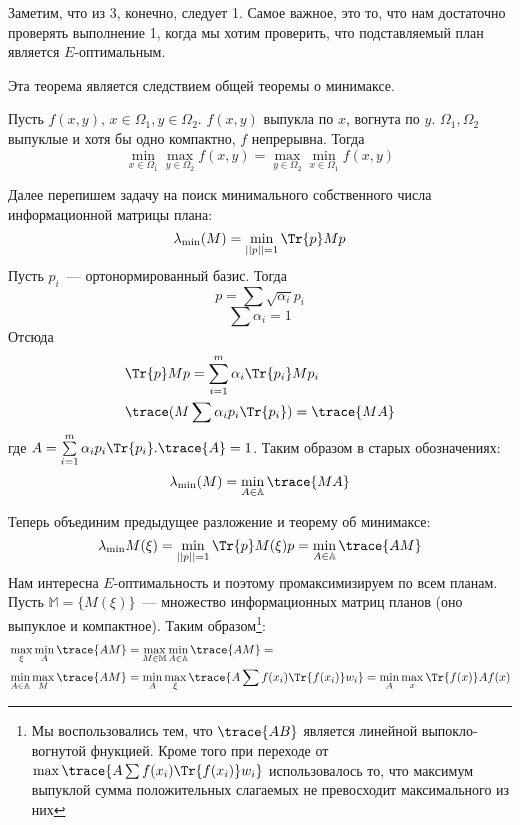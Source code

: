 Заметим, что из 3, конечно, следует 1. Самое важное, это то, что нам достаточно проверять выполнение 1, когда мы хотим проверить, что подставляемый план является $E$-оптимальным.

Эта теорема является следствием общей теоремы о минимаксе.
\begin{thm}
Пусть $f(x,y)$, $x\in \Omega_1, y\in \Omega_2$. $f(x,y)$ выпукла по $x$, вогнута по $y$. $\Omega_1, \Omega_2$ выпуклые и хотя бы одно компактно, $f$ непрерывна. Тогда 
$$ \min\limits_{x \in \Omega_1} \max\limits_{y \in \Omega_2} f(x,y) = \max\limits_{y \in \Omega_2} \min\limits_{x \in \Omega_1} f(x,y)$$
\end{thm}

Далее перепишем задачу на поиск минимального собственного числа информационной матрицы плана:
 $$\lambda_{\min}(M) = \min \limits_{||p||=1} \Tr{p}Mp$$
  Пусть $p_i$ — ортонормированный базис. Тогда 
$$p = \sum \sqrt{\alpha_i} p_i$$
$$ \sum \alpha_i = 1$$
Отсюда 
\begin{equation}
\begin{split}
&\Tr{p}Mp = \sum \limits_{i=1}^m \alpha_i\Tr{p_i}Mp_i \\
&\trace (M \sum \alpha_i p_i \Tr{p_i}) = \trace{MA}
\end{split}
\end{equation}
где $A = \sum \limits_{i=1}^m \alpha_i p_i\Tr{p_i}. \trace{A} = 1$. Таким образом в старых обозначениях:
$$\lambda_{\min}(M) = \min \limits_{A \in \mathbb{A}} \trace{MA}$$

Теперь объединим предыдущее разложение и теорему об минимаксе:
$$\lambda_{\min}M(\xi) = \min_{||p||=1}\Tr{p}M(\xi)p = \min_{A \in \mathbb{A}} \trace{AM}$$
Нам интересна $E$-оптимальность и поэтому промаксимизируем по всем планам. Пусть $\mathbb{M} = \{ M(\xi) \}$ — множество информационных матриц планов (оно выпуклое и компактное). Таким образом\footnote{Мы воспользовались тем, что $\trace{AB}$ является линейной выпокло-вогнутой фнукцией. Кроме того при переходе от
$\max\trace{A\sum f(x_i)\Tr{f(x_i)}w_i}$ использовалось то, что максимум выпуклой сумма положительных слагаемых не превосходит максимального из них}:
\begin{equation}
\begin{split}
    &\max\limits_{\xi}\min\limits_{A}\trace{AM} = \max_{M \in \mathbb{M}}\min\limits_{A \in \mathbb{A}} \trace{AM} = \\
&\min\limits_{A \in \mathbb{A}}\max\limits_M\trace{AM} = \min\limits_{A}\max\limits_{\xi}\trace{A\sum f(x_i)\Tr{f(x_i)}w_i} = \min\limits_{A}\max\limits_{x}\Tr{f(x)}Af(x)
\end{split}
\end{equation}

